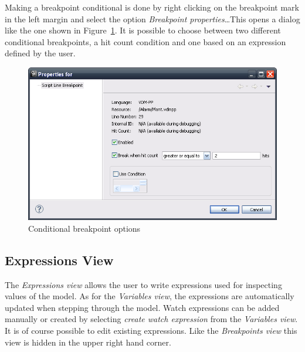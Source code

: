 \documentclass{overturerepchap}
\begin{document}
Making a breakpoint conditional is done by right clicking on the breakpoint
mark in the left margin and select the option \emph{Breakpoint properties}\ldots This
opens a dialog like the one shown in
Figure~\ref{fig:userguide:BreakpointConditional}. It is possible to choose
between two different conditional breakpoints, a hit count condition and one
based on an expression defined by the user. 

\begin{figure}[htp]
\begin{center}
  \includegraphics[width=.6\textwidth]{figures/Breakpointconditional}
  \caption{Conditional breakpoint options}
  \label{fig:userguide:BreakpointConditional}
\end{center}
\end{figure}

\subsection{Expressions View}

The \emph{Expressions view} allows the user to write expressions used for inspecting
values of the model. As for the \emph{Variables view}, the expressions are 
automatically updated when stepping through the model.
Watch expressions can be added manually or created by selecting \emph{create watch
expression} from the \emph{Variables view}. It is of course possible to edit existing
expressions. Like the \emph{Breakpoints view} this view is hidden in the upper right
hand corner.


\end{document}
